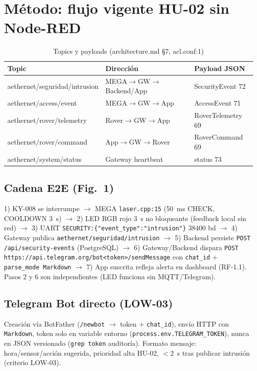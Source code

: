 \documentclass[conference]{IEEEtran}
\begin{document}
\section{Método: flujo vigente HU-02 sin Node-RED}
\begin{table}[t]
\centering
\caption{Topics y payloads (architecture.md \S7, acl.conf:1)}
\label{tab:topics}
\begin{tabular}{@{}lll@{}}
\toprule
Topic & Dirección & Payload JSON \\
\midrule
aethernet/seguridad/intrusion & MEGA$\rightarrow$GW$\rightarrow$Backend/App & SecurityEvent 72 \\
aethernet/access/event & MEGA$\rightarrow$GW$\rightarrow$App & AccessEvent 71 \\
aethernet/rover/telemetry & Rover$\rightarrow$GW$\rightarrow$App & RoverTelemetry 69 \\
aethernet/rover/command & App$\rightarrow$GW$\rightarrow$Rover & RoverCommand 69 \\
aethernet/system/status & Gateway heartbeat & status 73 \\
\bottomrule
\end{tabular}
\end{table}

\subsection{Cadena E2E (Fig.~1)}
1) KY-008 se interrumpe $\rightarrow$ MEGA \texttt{laser.cpp:15} (50~ms CHECK, COOLDOWN 3~s) $\rightarrow$ 2) LED RGB rojo 3~s no bloqueante (feedback local sin red) $\rightarrow$ 3) UART \texttt{SECURITY:\{"event\_type":"intrusion"\}} 38400 bd $\rightarrow$ 4) Gateway publica \texttt{aethernet/seguridad/intrusion} $\rightarrow$ 5) Backend persiste \texttt{POST /api/security-events} (PostgreSQL) $\rightarrow$ 6) Gateway/Backend dispara \texttt{POST https://api.telegram.org/bot<token>/sendMessage} con \texttt{chat\_id} + \texttt{parse\_mode Markdown} $\rightarrow$ 7) App suscrita refleja alerta en dashboard (RF-1.1). Pasos 2 y 6 son independientes (LED funciona sin MQTT/Telegram).

\subsection{Telegram Bot directo (LOW-03)}
Creación vía BotFather (\texttt{/newbot} $\rightarrow$ token + \texttt{chat\_id}), envío HTTP con \texttt{Markdown}, token solo en variable entorno (\texttt{process.env.TELEGRAM\_TOKEN}), nunca en JSON versionado (\texttt{grep token} auditoría). Formato mensaje: hora/sensor/acción sugerida, prioridad alta HU-02, $<$2~s tras publicar intrusión (criterio LOW-03).
\end{document}
